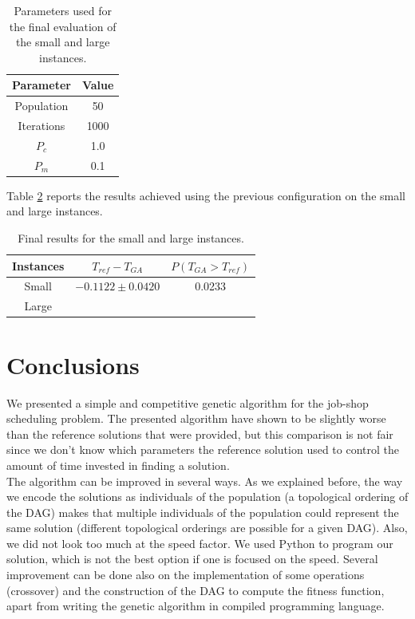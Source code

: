 \documentclass[10pt,a4paper]{article}
\begin{document}
\begin{table}[h]
\centering
\begin{tabular}{|c|c|}
\hline
Parameter & Value \\
\hline
Population &  50\\
Iterations & 1000\\
$P_c$ & 1.0\\
$P_m$ & 0.1\\
\hline
\end{tabular}
\caption{Parameters used for the final evaluation of the small and large instances.}
\label{tab:optimal_params}
\end{table}

Table \ref{tab:final_results} reports the results achieved using the previous configuration on the small and large instances.

\begin{table}[h]
\centering
\begin{tabular}{|c|c|c|}
\hline
Instances & $T_{ref} - T_{GA}$ & $P(T_{GA} > T_{ref})$\\
\hline
Small & $-0.1122 \pm 0.0420$ & 0.0233\\ 
Large & & \\
\hline
\end{tabular}
\caption{Final results for the small and large instances.}
\label{tab:final_results}
\end{table}

\section{Conclusions}
We presented a simple and competitive genetic algorithm for the job-shop scheduling problem. The presented algorithm have shown to be slightly worse than the reference solutions that were provided, but this comparison is not fair since we don't know which parameters the reference solution used to control the amount of time invested in finding a solution.\\

The algorithm can be improved in several ways. As we explained before, the way we encode the solutions as individuals of the population (a topological ordering of the DAG) makes that multiple individuals of the population could represent the same solution (different topological orderings are possible for a given DAG). Also, we did not look too much at the speed factor. We used Python to program our solution, which is not the best option if one is focused on the speed. Several improvement can be done also on the implementation of some operations (crossover) and the construction of the DAG to compute the fitness function, apart from writing the genetic algorithm in compiled programming language.



\end{document}

